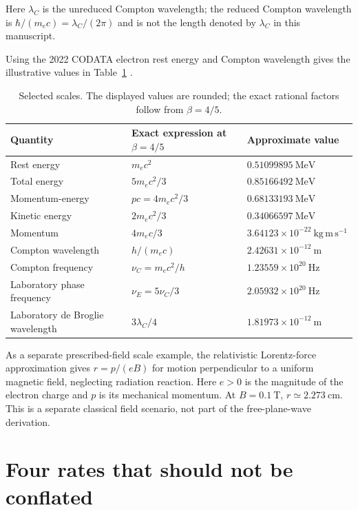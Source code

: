 \documentclass[12pt]{article}
\begin{document}
Here $\lambda_C$ is the unreduced Compton wavelength; the reduced Compton wavelength is $\hbar/(m_ec)=\lambda_C/(2\pi)$ and is not the length denoted by $\lambda_C$ in this manuscript.

Using the 2022 CODATA electron rest energy and Compton wavelength gives the illustrative values in Table~\ref{tab:numerical-values} \cite{CODATA2022}.
\begin{table}[ht]
  \centering
  \small
  \begin{tabular}{@{}lll@{}}
    \toprule
    Quantity & Exact expression at $\beta=4/5$ & Approximate value \\
    \midrule
    Rest energy & $m_ec^2$ & $0.51099895\ \mathrm{MeV}$ \\
    Total energy & $5m_ec^2/3$ & $0.85166492\ \mathrm{MeV}$ \\
    Momentum-energy & $pc=4m_ec^2/3$ & $0.68133193\ \mathrm{MeV}$ \\
    Kinetic energy & $2m_ec^2/3$ & $0.34066597\ \mathrm{MeV}$ \\
    Momentum & $4m_ec/3$ & $3.64123\times10^{-22}\ \mathrm{kg\,m\,s^{-1}}$ \\
    Compton wavelength & $h/(m_ec)$ & $2.42631\times10^{-12}\ \mathrm{m}$ \\
    Compton frequency & $\nu_C=m_ec^2/h$ & $1.23559\times10^{20}\ \mathrm{Hz}$ \\
    Laboratory phase frequency & $\nu_E=5\nu_C/3$ & $2.05932\times10^{20}\ \mathrm{Hz}$ \\
    Laboratory de Broglie wavelength & $3\lambda_C/4$ & $1.81973\times10^{-12}\ \mathrm{m}$ \\
    \bottomrule
  \end{tabular}
  \caption{Selected scales. The displayed values are rounded; the exact rational factors follow from $\beta=4/5$.}
  \label{tab:numerical-values}
\end{table}

As a separate prescribed-field scale example, the relativistic Lorentz-force approximation gives $r=p/(eB)$ for motion perpendicular to a uniform magnetic field, neglecting radiation reaction. Here $e>0$ is the magnitude of the electron charge and $p$ is its mechanical momentum. At $B=0.1\ \mathrm{T}$, $r\simeq2.273\ \mathrm{cm}$. This is a separate classical field scenario, not part of the free-plane-wave derivation.

\section{Four rates that should not be conflated}
\end{document}
